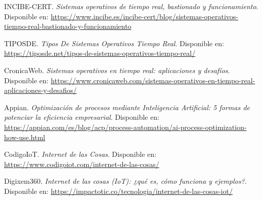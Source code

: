 \documentclass{article}
\begin{document}
\begin{thebibliography}{99}
     INCIBE-CERT. \textit{Sistemas operativos de tiempo real, bastionado y funcionamiento}. Disponible en: \url{https://www.incibe.es/incibe-cert/blog/sistemas-operativos-tiempo-real-bastionado-y-funcionamiento}
    
     TIPOSDE. \textit{Tipos De Sistemas Operativos Tiempo Real}. Disponible en: \url{https://tiposde.net/tipos-de-sistemas-operativos-tiempo-real/}

     CronicaWeb. \textit{Sistemas operativos en tiempo real: aplicaciones y desafíos}. Disponible en: \url{https://www.cronicaweb.com/sistemas-operativos-en-tiempo-real-aplicaciones-y-desafios/}

     Appian. \textit{Optimización de procesos mediante Inteligencia Artificial: 5 formas de potenciar la eficiencia empresarial}. Disponible en: \url{https://appian.com/es/blog/acp/process-automation/ai-process-optimization-how-use.html}

     CodigoIoT. \textit{Internet de las Cosas}. Disponible en: \url{https://www.codigoiot.com/internet-de-las-cosas/}

     Digixem360. \textit{Internet de las cosas (IoT): ¿qué es, cómo funciona y ejemplos?}. Disponible en: \url{https://impactotic.co/tecnologia/internet-de-las-cosas-iot/}

\end{thebibliography}
\end{document}
